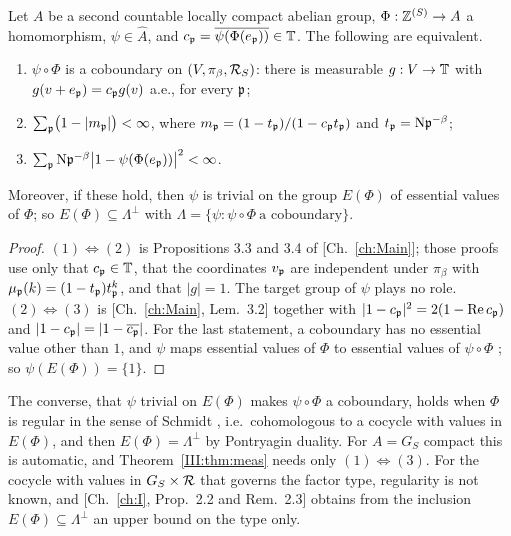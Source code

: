 \begin{lemma}\label{III:lem:dict}
Let $A$ be a second countable locally compact abelian group, $\Phi:\mathbb{Z}^{(S)}\to A$ a
homomorphism, $\psi\in\widehat A$, and $c_{\mathfrak{p}}=\overline{\psi(\Phi(e_{\mathfrak{p}}))}\in\mathbb{T}$. The
following are equivalent.
\begin{enumerate}
\item $\psi\circ\Phi$ is a coboundary on $(V,\pi_\beta,\mathcal{R}_S)$: there is measurable
$g:V\to\mathbb{T}$ with $g(v+e_{\mathfrak{p}})=c_{\mathfrak{p}} g(v)$ a.e., for every $\mathfrak{p}$;
\item $\sum_{\mathfrak{p}}\bigl(1-|m_{\mathfrak{p}}|\bigr)<\infty$, where $m_{\mathfrak{p}}=(1-t_{\mathfrak{p}})/(1-c_{\mathfrak{p}} t_{\mathfrak{p}})$ and
$t_{\mathfrak{p}}=\mathrm{N}\mathfrak{p}^{-\beta}$;
\item $\sum_{\mathfrak{p}}\mathrm{N}\mathfrak{p}^{-\beta}\bigl|1-\psi(\Phi(e_{\mathfrak{p}}))\bigr|^2<\infty$.
\end{enumerate}
Moreover, if these hold, then $\psi$ is trivial on the group $E(\Phi)$ of essential values
of $\Phi$; so $E(\Phi)\subseteq\Lambda^\perp$ with
$\Lambda=\{\psi:\psi\circ\Phi\ \text{a coboundary}\}$.
\end{lemma}

\begin{proof}
$(1)\Leftrightarrow(2)$ is Propositions 3.3 and 3.4 of [Ch.~\ref{ch:Main}]; those proofs use only
that $c_{\mathfrak{p}}\in\mathbb{T}$, that the coordinates $v_{\mathfrak{p}}$ are independent under $\pi_\beta$ with
$\mu_{\mathfrak{p}}(k)=(1-t_{\mathfrak{p}})t_{\mathfrak{p}}^k$, and that $|g|=1$. The target group of $\psi$ plays no role.
$(2)\Leftrightarrow(3)$ is [Ch.~\ref{ch:Main}, Lem.~3.2] together with
$|1-c_{\mathfrak{p}}|^2=2(1-\operatorname{Re}c_{\mathfrak{p}})$ and $|1-c_{\mathfrak{p}}|=|1-\overline{c_{\mathfrak{p}}}|$.
For the last statement, a coboundary has no essential value other than $1$, and
$\psi$ maps essential values of $\Phi$ to essential values of $\psi\circ\Phi$
\cite{Schmidt}; so $\psi(E(\Phi))=\{1\}$.
\end{proof}

\begin{remark}\label{III:rem:noconverse}
The converse, that $\psi$ trivial on $E(\Phi)$ makes $\psi\circ\Phi$ a coboundary, holds
when $\Phi$ is regular in the sense of Schmidt \cite{Schmidt}, i.e.\ cohomologous to a
cocycle with values in $E(\Phi)$, and then $E(\Phi)=\Lambda^\perp$ by Pontryagin duality.
For $A=G_S$ compact this is automatic, and Theorem~\ref{III:thm:meas} needs only
$(1)\Leftrightarrow(3)$. For the cocycle with values in $G_S\times\mathcal{R}$ that governs the
factor type, regularity is not known, and [Ch.~\ref{ch:I}, Prop.~2.2 and Rem.~2.3] obtains
from the inclusion $E(\Phi)\subseteq\Lambda^\perp$ an upper bound on the type only.
\end{remark}

